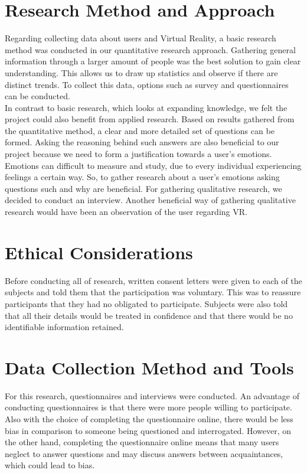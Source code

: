 \documentclass[12pt]{report}
\begin{document}
\section{Research Method and Approach}
Regarding collecting data about users and Virtual Reality, a basic research method was conducted in our quantitative research approach. Gathering general information through a larger amount of people was the best solution to gain clear understanding. This allows us to draw up statistics and observe if there are distinct trends. To collect this data, options such as survey and questionnaires can be conducted.  
\\

In contrast to basic research, which looks at expanding knowledge, we felt the project could also benefit from applied research. Based on results gathered from the quantitative method, a clear and more detailed set of questions can be formed. Asking the reasoning behind such answers are also beneficial to our project because we need to form a justification towards a user’s emotions. Emotions can difficult to measure and study, due to every individual experiencing feelings a certain way. So, to gather research about a user’s emotions asking questions such and why are beneficial. For gathering qualitative research, we decided to conduct an interview. Another beneficial way of gathering qualitative research would have been an observation of the user regarding VR. 

\section{Ethical Considerations}
Before conducting all of research, written consent letters were given to each of the subjects and told them that the participation was voluntary. This was to reassure participants that they had no obligated to participate. Subjects were also told that all their details would be treated in confidence and that there would be no identifiable information retained.

\section{Data Collection Method and Tools}
For this research, questionnaires and interviews were conducted. An advantage of conducting questionnaires is that there were more people willing to participate. Also with the choice of completing the questionnaire online, there would be less bias in comparison to someone being questioned and interrogated. However, on the other hand, completing the questionnaire online means that many users neglect to answer questions and may discuss answers between acquaintances, which could lead to bias.  
\\
\end{document}

